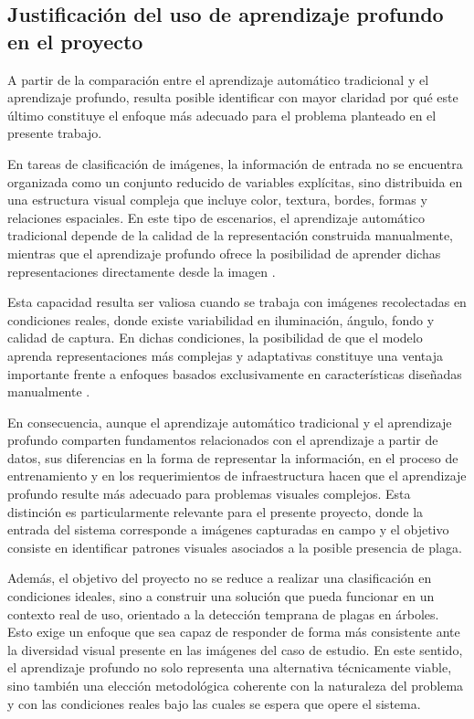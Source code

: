 \subsection{Justificación del uso de aprendizaje profundo en el proyecto}

A partir de la comparación entre el aprendizaje automático tradicional y el aprendizaje profundo, resulta posible identificar con mayor claridad por qué este último constituye el enfoque más adecuado para el problema planteado en el presente trabajo.

En tareas de clasificación de imágenes, la información de entrada no se encuentra organizada como un conjunto reducido de variables explícitas, sino distribuida en una estructura visual compleja que incluye color, textura, bordes, formas y relaciones espaciales. En este tipo de escenarios, el aprendizaje automático tradicional depende de la calidad de la representación construida manualmente, mientras que el aprendizaje profundo ofrece la posibilidad de aprender dichas representaciones directamente desde la imagen \cite{aws2026ml_vs_dl}.

Esta capacidad resulta ser valiosa cuando se trabaja con imágenes recolectadas en condiciones reales, donde existe variabilidad en iluminación, ángulo, fondo y calidad de captura. En dichas condiciones, la posibilidad de que el modelo aprenda representaciones más complejas y adaptativas constituye una ventaja importante frente a enfoques basados exclusivamente en características diseñadas manualmente \cite{aws2026ml_vs_dl}.

En consecuencia, aunque el aprendizaje automático tradicional y el aprendizaje profundo comparten fundamentos relacionados con el aprendizaje a partir de datos, sus diferencias en la forma de representar la información, en el proceso de entrenamiento y en los requerimientos de infraestructura hacen que el aprendizaje profundo resulte más adecuado para problemas visuales complejos. Esta distinción es particularmente relevante para el presente proyecto, donde la entrada del sistema corresponde a imágenes capturadas en campo y el objetivo consiste en identificar patrones visuales asociados a la posible presencia de plaga.

Además, el objetivo del proyecto no se reduce a realizar una clasificación en condiciones ideales, sino a construir una solución que pueda funcionar en un contexto real de uso, orientado a la detección temprana de plagas en árboles. Esto exige un enfoque que sea capaz de responder de forma más consistente ante la diversidad visual presente en las imágenes del caso de estudio. En este sentido, el aprendizaje profundo no solo representa una alternativa técnicamente viable, sino también una elección metodológica coherente con la naturaleza del problema y con las condiciones reales bajo las cuales se espera que opere el sistema.
